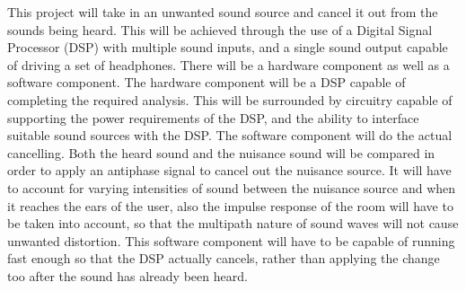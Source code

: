 \label{goals}
This project will take in an unwanted sound source and cancel it out from the sounds being heard. This will be achieved through the use of a Digital Signal Processor (DSP) with multiple sound inputs, and a single sound output capable of driving a set of headphones.
There will be a hardware component as well as a software component. The hardware component will be a DSP capable of completing the required analysis. This will be surrounded by circuitry capable of supporting the power requirements of the DSP, and the ability to interface suitable sound sources with the DSP.
The software component will do the actual cancelling. Both the heard sound and the nuisance sound will be compared in order to apply an antiphase signal to cancel out the nuisance source. It will have to account for varying intensities of sound between the nuisance source and when it reaches the ears of the user, also the impulse response of the room will have to be taken into account, so that the multipath nature of sound waves will not cause unwanted distortion. This software component will have to be capable of running fast enough so that the DSP actually cancels, rather than applying the change too after the sound has already been heard.
